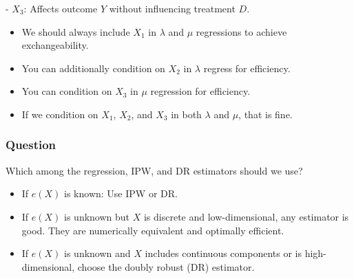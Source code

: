 - \(X_3\): Affects outcome \(Y\) without influencing treatment \(D\).

\begin{center}
\end{center}

\begin{itemize}
    \item We should always include \(X_1\) in \(\lambda\) and \(\mu\) regressions to achieve exchangeability.
    \item You can additionally condition on \(X_2\) in \(\lambda\) regress for efficiency.
    \item You can condition on \(X_3\) in \(\mu\) regression for efficiency.
    \item If we condition on \(X_1\), \(X_2\), and \(X_3\) in both \(\lambda\) and \(\mu\), that is fine.
\end{itemize}

\subsubsection{Question}
Which among the regression, IPW, and DR estimators should we use?

\begin{itemize}
    \item If \(e(X)\) is known: Use IPW or DR.
    
    \item If \(e(X)\) is unknown but \(X\) is discrete and low-dimensional, any estimator is good. They are numerically equivalent and optimally efficient.
    
    \item If \(e(X)\) is unknown and \(X\) includes continuous components or is high-dimensional, choose the doubly robust (DR) estimator.
\end{itemize}

